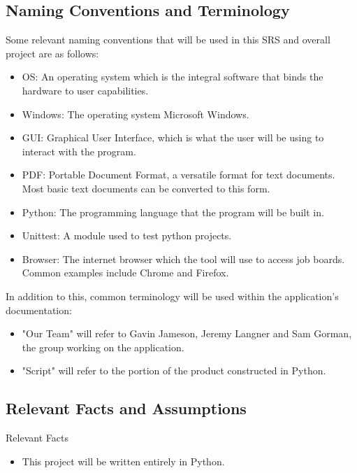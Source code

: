 \documentclass[12pt, titlepage]{article}
\begin{document}
\subsection{Naming Conventions and Terminology}

Some relevant naming conventions that will be used in this SRS and overall project are as follows:

\begin{itemize}
  \item OS: An operating system which is the integral software that binds the hardware to user capabilities.
  \item Windows: The operating system Microsoft Windows.
  \item GUI: Graphical User Interface, which is what the user will be using to interact with the program.
  \item PDF: Portable Document Format, a versatile format for text documents. Most basic text documents can be converted to this form.
  \item Python: The programming language that the program will be built in.
  \item Unittest: A module used to test python projects.
  \item Browser: The internet browser which the tool will use to access job boards. Common examples include Chrome and Firefox. 
\end{itemize}

In addition to this, common terminology will be used within the application's documentation:
\begin{itemize}
  \item "Our Team" will refer to Gavin Jameson, Jeremy Langner and Sam Gorman, the group working on the application.
  \item "Script" will refer to the portion of the product constructed in Python.
\end{itemize}

\subsection{Relevant Facts and Assumptions}

Relevant Facts
\begin{itemize}
    \item This project will be written entirely in Python.
\end{itemize}
\end{document}
